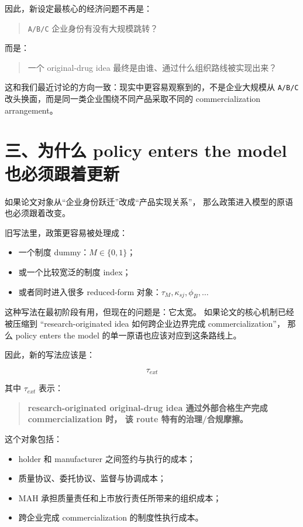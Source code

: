 \documentclass[12pt]{ctexart}
\begin{document}
因此，新设定最核心的经济问题不再是：

\begin{quote}
\texttt{A/B/C} 企业身份有没有大规模跳转？
\end{quote}

而是：

\begin{quote}
一个 original-drug idea 最终是由谁、通过什么组织路线被实现出来？
\end{quote}

这和我们最近讨论的方向一致：现实中更容易观察到的，不是企业大规模从
\texttt{A/B/C} 改头换面，而是同一类企业围绕不同产品采取不同的
commercialization arrangement。

\section{三、为什么 policy enters the model 也必须跟着更新}

如果论文对象从“企业身份跃迁”改成“产品实现关系”，
那么政策进入模型的原语也必须跟着改变。

旧写法里，政策更容易被处理成：

\begin{itemize}[leftmargin=2em]
    \item 一个制度 dummy：\(M\in\{0,1\}\)；
    \item 或一个比较宽泛的制度 index；
    \item 或者同时进入很多 reduced-form 对象：\(\tau_M,\kappa_{sj},\phi_B,\ldots\)
\end{itemize}

这种写法在最初阶段有用，但现在的问题是：它太宽。
如果论文的核心机制已经被压缩到
“research-originated idea 如何跨企业边界完成 commercialization”，
那么 policy enters the model 的单一原语也应该对应到这条路线上。

因此，新的写法应该是：

\[
\tau_{ext}
\]

其中 \(\tau_{ext}\) 表示：

\begin{quote}
\textbf{research-originated original-drug idea 通过外部合格生产完成 commercialization 时，
该 route 特有的治理/合规摩擦。}
\end{quote}

这个对象包括：

\begin{itemize}[leftmargin=2em]
    \item holder 和 manufacturer 之间签约与执行的成本；
    \item 质量协议、委托协议、监督与协调成本；
    \item MAH 承担质量责任和上市放行责任所带来的组织成本；
    \item 跨企业完成 commercialization 的制度性执行成本。
\end{itemize}
\end{document}

